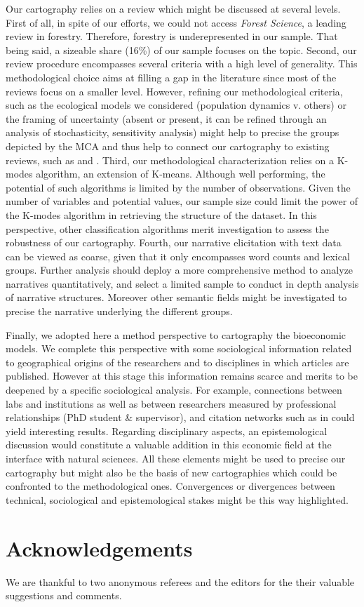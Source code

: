 Our cartography relies on a review which might be discussed at several levels. First of all, in spite of our efforts, we could not access \textit{Forest Science}, a leading review in forestry. Therefore, forestry is underepresented in our sample. That being said, a sizeable share (16\%) of our sample focuses on the topic.
Second, our review procedure encompasses several criteria with a high level of generality. This methodological choice aims at filling a gap in the literature since most of the reviews focus on a smaller level. However, refining our methodological criteria, such as the ecological models we considered (population dynamics v. others) or the framing of uncertainty (absent or present, it can be refined through an analysis of stochasticity, sensitivity analysis) might help to precise the groups depicted by the MCA and thus help to connect our cartography to existing reviews, such as \cite{Eppink2007} and \cite{Castro2018}.
Third, our methodological characterization relies on a K-modes algorithm, an extension of K-means. Although well performing, the potential of such algorithms is limited by the number of observations. Given the number of variables and potential values, our sample size could limit the power of the K-modes algorithm in retrieving the structure of the dataset. In this perspective, other classification algorithms merit investigation to assess the robustness of our cartography. 
Fourth, our narrative elicitation with text data can be viewed as coarse, given that it only encompasses word counts and lexical groups. Further analysis should deploy a more comprehensive method to analyze narratives quantitatively, and select a limited sample to conduct in depth analysis of narrative structures. Moreover other semantic fields might be investigated to precise the narrative underlying the different groups. 

Finally, we adopted here a method perspective to cartography the bioeconomic models. We complete this perspective with some sociological information related to geographical origins of the researchers and to disciplines in which articles are published. However at this stage this information remains scarce and merits to be deepened by a specific sociological analysis. For example, connections between labs and institutions as well as between researchers measured by professional relationships (PhD student \& supervisor), and citation networks such as in \cite{Smessaert2020} could yield interesting results. Regarding disciplinary aspects, an epistemological discussion would constitute a valuable addition in this economic field at the interface with natural sciences. All these elements might be used to precise our cartography but might also be the basis of new cartographies which could be confronted to the methodological ones. Convergences or divergences between technical, sociological and epistemological stakes might be this way highlighted.

\section*{Acknowledgements}
We are thankful to two anonymous referees and the editors for the their valuable suggestions and comments. 


